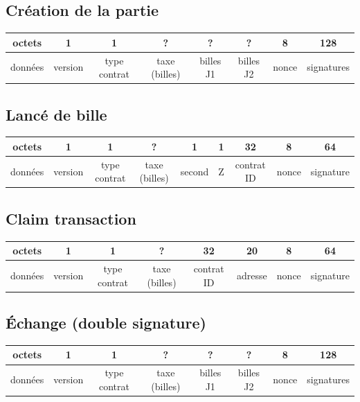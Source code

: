 \documentclass{article}
\begin{document}
\subsection{Création de la partie}
\hspace*{-1cm}%
\begin{tabular}{ |c|c|c|c|c|c|c|c|} 
 \hline
 octets & 1 & 1 & ? & ? & ? & 8 & 128\\ 
 \hline
    données & version & type contrat & taxe (billes) & billes J1 & billes J2 & nonce & signatures\\ 
 \hline
\end{tabular}

\subsection{Lancé de bille}
\hspace*{-1cm}%
\begin{tabular}{ |c|c|c|c|c|c|c|c|c|} 
 \hline
 octets & 1 & 1 & ? & 1 & 1 & 32 & 8 & 64 \\ 
 \hline
    données & version & type contrat & taxe (billes) & second & Z & contrat ID & nonce & signature\\ 
 \hline
\end{tabular}

\subsection{Claim transaction}
\hspace*{-1cm}%
\begin{tabular}{ |c|c|c|c|c|c|c|c|} 
 \hline
 octets & 1 & 1 & ? & 32 & 20 & 8 & 64 \\ 
 \hline
    données & version & type contrat & taxe (billes) & contrat ID & adresse & nonce & signature\\ 
 \hline
\end{tabular}

\subsection{Échange (double signature)}
\hspace*{-1cm}%
\begin{tabular}{ |c|c|c|c|c|c|c|c|} 
 \hline
 octets & 1 & 1 & ? & ? & ? & 8 & 128\\ 
 \hline
    données & version & type contrat & taxe (billes) & billes J1 & billes J2 & nonce & signatures\\ 
 \hline
\end{tabular}
\end{document}
